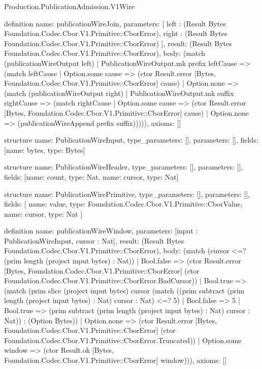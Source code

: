 \begin{lexlean}{Production.PublicationAdmission.V1Wire}
\begin{semanticmodule}
definition{
  name: publicationWireJoin,
  parameters: [
    left : (Result Bytes Foundation.Codec.Cbor.V1.Primitive::CborError),
    right : (Result Bytes Foundation.Codec.Cbor.V1.Primitive::CborError)
  ],
  result: (Result Bytes Foundation.Codec.Cbor.V1.Primitive::CborError),
  body: (match (publicationWireOutput left)
    | PublicationWireOutput.mk prefix leftCause => (match leftCause
      | Option.some cause => (ctor Result.error [Bytes, Foundation.Codec.Cbor.V1.Primitive::CborError] cause)
      | Option.none => (match (publicationWireOutput right)
        | PublicationWireOutput.mk suffix rightCause => (match rightCause
          | Option.some cause => (ctor Result.error [Bytes, Foundation.Codec.Cbor.V1.Primitive::CborError] cause)
          | Option.none => (publicationWireAppend prefix suffix))))),
  axioms: []
}

structure{
  name: PublicationWireInput,
  type_parameters: [],
  parameters: [],
  fields: [{name: bytes, type: Bytes}]
}

structure{
  name: PublicationWireHeader,
  type_parameters: [],
  parameters: [],
  fields: [{name: count, type: Nat}, {name: cursor, type: Nat}]
}

structure{
  name: PublicationWirePrimitive,
  type_parameters: [],
  parameters: [],
  fields: [
    {name: value, type: Foundation.Codec.Cbor.V1.Primitive::CborValue},
    {name: cursor, type: Nat}
  ]
}

definition{
  name: publicationWireWindow,
  parameters: [input : PublicationWireInput, cursor : Nat],
  result: (Result Bytes Foundation.Codec.Cbor.V1.Primitive::CborError),
  body: (match (cursor <=? (prim length (project input bytes) : Nat))
    | Bool.false => (ctor Result.error [Bytes, Foundation.Codec.Cbor.V1.Primitive::CborError] (ctor Foundation.Codec.Cbor.V1.Primitive::CborError.BadCursor))
    | Bool.true => (match (prim slice (project input bytes) cursor (match ((prim subtract (prim length (project input bytes) : Nat) cursor : Nat) <=? 5)
        | Bool.false => 5
        | Bool.true => (prim subtract (prim length (project input bytes) : Nat) cursor : Nat)) : (Option Bytes))
      | Option.none => (ctor Result.error [Bytes, Foundation.Codec.Cbor.V1.Primitive::CborError] (ctor Foundation.Codec.Cbor.V1.Primitive::CborError.Truncated))
      | Option.some window => (ctor Result.ok [Bytes, Foundation.Codec.Cbor.V1.Primitive::CborError] window))),
  axioms: []
}


\end{semanticmodule}
\end{lexlean}
